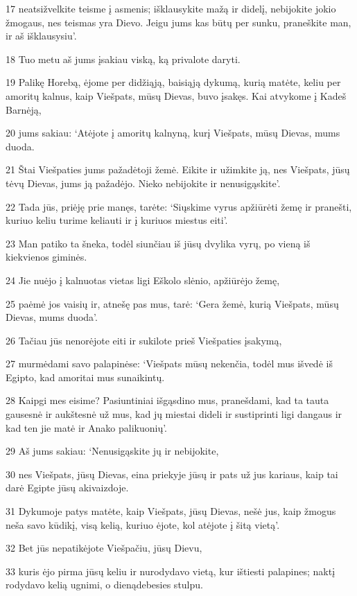 \par 17 neatsižvelkite teisme į asmenis; išklausykite mažą ir didelį, nebijokite jokio žmogaus, nes teismas yra Dievo. Jeigu jums kas būtų per sunku, praneškite man, ir aš išklausysiu’. 
\par 18 Tuo metu aš jums įsakiau viską, ką privalote daryti. 
\par 19 Palikę Horebą, ėjome per didžiąją, baisiąją dykumą, kurią matėte, keliu per amoritų kalnus, kaip Viešpats, mūsų Dievas, buvo įsakęs. Kai atvykome į Kadeš Barnėją, 
\par 20 jums sakiau: ‘Atėjote į amoritų kalnyną, kurį Viešpats, mūsų Dievas, mums duoda. 
\par 21 Štai Viešpaties jums pažadėtoji žemė. Eikite ir užimkite ją, nes Viešpats, jūsų tėvų Dievas, jums ją pažadėjo. Nieko nebijokite ir nenusigąskite’. 
\par 22 Tada jūs, priėję prie manęs, tarėte: ‘Siųskime vyrus apžiūrėti žemę ir pranešti, kuriuo keliu turime keliauti ir į kuriuos miestus eiti’. 
\par 23 Man patiko ta šneka, todėl siunčiau iš jūsų dvylika vyrų, po vieną iš kiekvienos giminės. 
\par 24 Jie nuėjo į kalnuotas vietas ligi Eškolo slėnio, apžiūrėjo žemę, 
\par 25 paėmė jos vaisių ir, atnešę pas mus, tarė: ‘Gera žemė, kurią Viešpats, mūsų Dievas, mums duoda’. 
\par 26 Tačiau jūs nenorėjote eiti ir sukilote prieš Viešpaties įsakymą, 
\par 27 murmėdami savo palapinėse: ‘Viešpats mūsų nekenčia, todėl mus išvedė iš Egipto, kad amoritai mus sunaikintų. 
\par 28 Kaipgi mes eisime? Pasiuntiniai išgąsdino mus, pranešdami, kad ta tauta gausesnė ir aukštesnė už mus, kad jų miestai dideli ir sustiprinti ligi dangaus ir kad ten jie matė ir Anako palikuonių’. 
\par 29 Aš jums sakiau: ‘Nenusigąskite jų ir nebijokite, 
\par 30 nes Viešpats, jūsų Dievas, eina priekyje jūsų ir pats už jus kariaus, kaip tai darė Egipte jūsų akivaizdoje. 
\par 31 Dykumoje patys matėte, kaip Viešpats, jūsų Dievas, nešė jus, kaip žmogus neša savo kūdikį, visą kelią, kuriuo ėjote, kol atėjote į šitą vietą’. 
\par 32 Bet jūs nepatikėjote Viešpačiu, jūsų Dievu, 
\par 33 kuris ėjo pirma jūsų keliu ir nurodydavo vietą, kur ištiesti palapines; naktį rodydavo kelią ugnimi, o dieną­debesies stulpu. 
